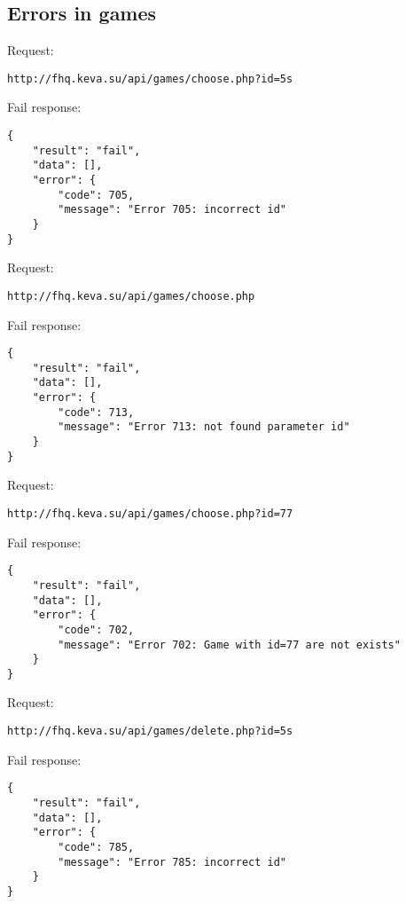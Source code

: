 \subsection{Errors in games}
\label{sec:code_errors_games}
\par

\begin{center}
\end{center}



Request:
\begin{Verbatim}[frame=single]
http://fhq.keva.su/api/games/choose.php?id=5s
\end{Verbatim}
Fail response:
\begin{Verbatim}[frame=single]
{
    "result": "fail",
    "data": [],
    "error": {
        "code": 705,
        "message": "Error 705: incorrect id"
    }
}
\end{Verbatim}

Request:
\begin{Verbatim}[frame=single]
http://fhq.keva.su/api/games/choose.php
\end{Verbatim}
Fail response:
\begin{Verbatim}[frame=single]
{
    "result": "fail",
    "data": [],
    "error": {
        "code": 713,
        "message": "Error 713: not found parameter id"
    }
}
\end{Verbatim}


Request:
\begin{Verbatim}[frame=single]
http://fhq.keva.su/api/games/choose.php?id=77
\end{Verbatim}
Fail response:
\begin{Verbatim}[frame=single]
{
    "result": "fail",
    "data": [],
    "error": {
        "code": 702,
        "message": "Error 702: Game with id=77 are not exists"
    }
}
\end{Verbatim}



Request:
\begin{Verbatim}[frame=single]
http://fhq.keva.su/api/games/delete.php?id=5s
\end{Verbatim}
Fail response:
\begin{Verbatim}[frame=single]
{
    "result": "fail",
    "data": [],
    "error": {
        "code": 785,
        "message": "Error 785: incorrect id"
    }
}
\end{Verbatim}


